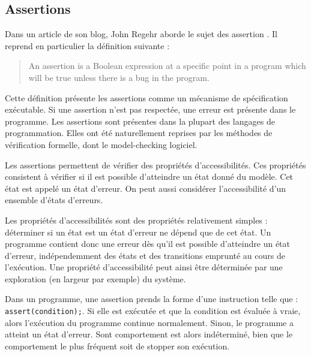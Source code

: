 \subsection{Assertions}

Dans un article de son blog, John Regehr aborde le sujet des assertion
\cite{assertion_regehr}. Il reprend en particulier la définition suivante :

\begin{quotation}
An assertion is a Boolean expression at a specific point in a program which will
be true unless there is a bug in the program.
\hfill \cite{assertion_regehr}
\end{quotation}





Cette définition présente les assertions comme un mécanisme de spécification
exécutable. Si une assertion n'est pas respectée, une erreur est présente dans
le programme. Les assertions sont présentes dans la plupart des langages de
programmation. Elles ont été naturellement reprises par les méthodes de
vérification formelle, dont le model-checking logiciel.

Les assertions permettent de vérifier des propriétés d'accessibilités. Ces
propriétés consistent à vérifier si il est possible d'atteindre un état donné du
modèle. Cet état est appelé un état d'erreur. On peut aussi considérer
l'accessibilité d'un ensemble d'états d'erreurs.

Les propriétés d'accessibilités sont des propriétés relativement simples :
déterminer si un état est un état d'erreur ne dépend que de cet état. Un
programme contient donc une erreur dès qu'il est possible d'atteindre un état
d'erreur, indépendemment des états et des transitions emprunté au cours de
l'exécution. Une propriété d'accessibilité peut ainsi être déterminée par une
exploration (en largeur par exemple) du système.

Dans un programme, une assertion prends la forme d'une instruction telle que :
\lstinline!assert(condition);!.
Si elle est exécutée et que la condition est évaluée à vraie, alors l'exécution
du programme continue normalement.
Sinon, le programme a atteint un état d'erreur. Sont comportement est alors
indéterminé, bien que le comportement le plus fréquent soit de stopper son
exécution.

